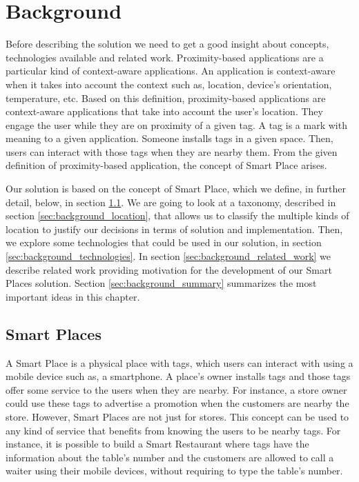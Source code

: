
\chapter{Background}
\label{chapter:background}
Before describing the solution we need to get a good insight about concepts, technologies available and related work.
Proximity-based applications are a particular kind of context-aware applications.
An application is context-aware when it takes into account the context such as, location, device's orientation, temperature, etc.
Based on this definition, proximity-based applications are context-aware applications that take into account the user's location.
They engage the user while they are on proximity of a given tag.
A tag is a mark with meaning to a given application.
Someone installs tags in a given space.
Then, users can interact with those tags when they are nearby them.
From the given definition of proximity-based application, the concept of Smart Place arises.

Our solution is based on the concept of Smart Place, which we define, in further detail, below, in section \ref{sec:background_smart_places}.
We are going to look at a taxonomy, described in section \ref{sec:background_location}, that allows us to classify the multiple kinds of location to justify our decisions in terms of solution and implementation.
Then, we explore some technologies that could be used in our solution, in section \ref{sec:background_technologies}.
In section \ref{sec:background_related_work} we describe related work providing motivation for the development of our Smart Places solution.
Section \ref{sec:background_summary} summarizes the most important ideas in this chapter.

\section{Smart Places}
\label{sec:background_smart_places}
A Smart Place is a physical place with tags, which users can interact with using a mobile device such as, a smartphone.
A place's owner installs tags and those tags offer some service to the users when they are nearby.
For instance, a store owner could use these tags to advertise a promotion when the customers are nearby the store.
However, Smart Places are not just for stores.
This concept can be used to any kind of service that benefits from knowing the users to be nearby tags.
For instance, it is possible to build a Smart Restaurant where tags have the information about the table's number and the customers are allowed to call a waiter using their mobile devices, without requiring to type the table's number.

